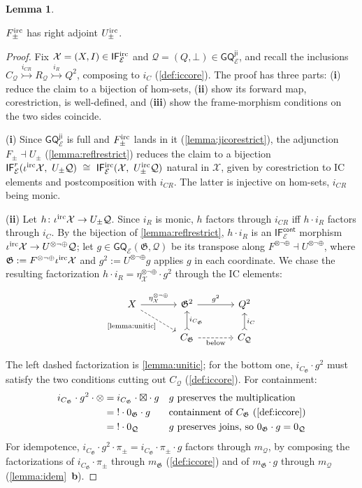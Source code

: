 \documentclass{article}
\makeatletter
\newcommand{\allproofs}{} %
\newif\ifproofsinappendix
\newcommand{\lemmawithproof}[3]{%
  \begin{lemma}\label{#1}
    #2  
    \ifproofsinappendix \hyperref[xxx#1]{(Proof)} \fi
  \end{lemma}
    \ifproofsinappendix
  \g@addto@macro\allproofs{%
    \par\medskip
    \noindent
    \subsection*{\cref{#1}}\par
    #2\par
    \begin{proof}\label{xxx#1}
      #3
    \end{proof}%
  }
      \else

    \begin{proof}
      #3
    \end{proof}
    \fi 
}
\theoremstyle{definition}
\newtheorem{lemma}{Lemma}[section]
\newcommand{\G}{\mathfrak{G}}
\newcommand{\cE}{\mathcal{E}}
\newcommand{\cQ}{\mathcal{Q}}
\newcommand{\cX}{\mathcal{X}}
\newcommand{\cat}[1]{\mathsf{#1}}
\makeatother
\begin{document}
 \lemmawithproof{lemma:undercont}{
$F^{\rm irc}_\pm$ has right adjoint $U^{\rm irc}_\pm$.
}{
Fix $\cX=(X,I)\in\cat{IF^{\rm irc}_\cE}$ and $\cQ=(Q,\bot)\in\cat{GQ^{ji}_\cE}$, and recall the inclusions
$C_\cQ\overset{i_{CR}}{\rightarrowtail}R_\cQ \overset{i_R}{\rightarrowtail}Q^2$, composing to $i_C$
(\cref{def:iccore}). 
The proof has three parts: ({\bf i}) reduce the claim to a bijection of hom-sets, ({\bf ii}) show its forward map, corestriction, is well-defined, and ({\bf iii}) show the frame-morphism conditions on the two sides coincide.

({\bf i}) Since $\cat{GQ^{ji}_\cE}$ is full and $F^{\rm irc}_\pm$ lands in it (\cref{lemma:jicorestrict}), the adjunction $F_\pm\dashv U_\pm$
(\cref{lemma:reflrestrict}) reduces the claim to a bijection 
$\cat{IF}^{r}_\cE(\iota^{\rm irc}\cX,\ U_\pm\cQ)\ \cong\
\cat{IF^{\rm irc}_\cE}(\cX,\ U^{\rm irc}_\pm\cQ)$ natural in $\cX$, given by corestriction to IC elements and postcomposition
with $i_{CR}$. The latter is injective on hom-sets, $i_{CR}$ being monic.

({\bf ii}) Let $h\colon\iota^{\rm irc}\cX\to U_\pm\cQ$. Since $i_R$ is
monic, $h$ factors through $i_{CR}$ iff $h\cdot i_R$ factors through $i_C$.
By the bijection of \cref{lemma:reflrestrict}, $h\cdot i_R$ is an
$\cat{IF^{cont}_\cE}$ morphism $\iota^{\rm irc}\cX\to U^{\otimes\neg\oplus}\cQ$;
let $g\in\cat{GQ}_\cE(\G,\cQ)$ be its transpose along
$F^{\otimes\neg\oplus}\dashv U^{\otimes\neg\oplus}$, where
$\G:=F^{\otimes\neg\oplus}\iota^{\rm irc}\cX$ and
$g^2:=U^{\otimes\neg\oplus}g$ applies $g$ in each coordinate. We chase the
resulting factorization $h\cdot i_R=\eta^{\otimes\neg\oplus}_\cX\cdot g^2$
through the IC elements:

\[\begin{tikzcd}[ampersand replacement=\&, column sep=large]
	X \& {\G^2} \& {Q^2} \\
	\& {C_\G} \& {C_\cQ}
	\arrow["{\eta^{\otimes\neg\oplus}_\cX}", from=1-1, to=1-2]
	\arrow["{g^2}", from=1-2, to=1-3]
	\arrow["{i_{C_\G}}"{swap}, tail, from=2-2, to=1-2]
	\arrow["{i_C}"{swap}, tail, from=2-3, to=1-3]
	\arrow["{\text{\cref{lemma:unitic}}}"{swap}, dashed, from=1-1, to=2-2]
	\arrow["{\text{below}}"{swap}, dashed, from=2-2, to=2-3]
\end{tikzcd}\]

The left dashed factorization is \cref{lemma:unitic}; for the bottom one, $i_{C_\G}\cdot g^2$ must satisfy the two conditions cutting out $C_\cQ$ (\cref{def:iccore}). 
For containment:
\begin{align*}
i_{C_\G}\cdot g^2\cdot\otimes
&= i_{C_\G}\cdot\boxtimes\cdot g
  && g\text{ preserves the multiplication}\\
&= \;!\cdot 0_\G\cdot g
  && \text{containment of }C_\G\ \text{(\cref{def:iccore})}\\
&= \;!\cdot 0_\cQ
  && g\text{ preserves joins, so }0_\G\cdot g=0_\cQ
\end{align*}
For idempotence, $i_{C_\G}\cdot g^2\cdot\pi_\pm=i_{C_\G}\cdot\pi_\pm\cdot g$ factors through $m_\cQ$, by composing the factorizations of $i_{C_\G}\cdot\pi_\pm$ through $m_\G$ (\cref{def:iccore}) and of $m_\G\cdot g$ through $m_\cQ$ (\cref{lemma:idem}~{\bf b}).

}
\end{document}
